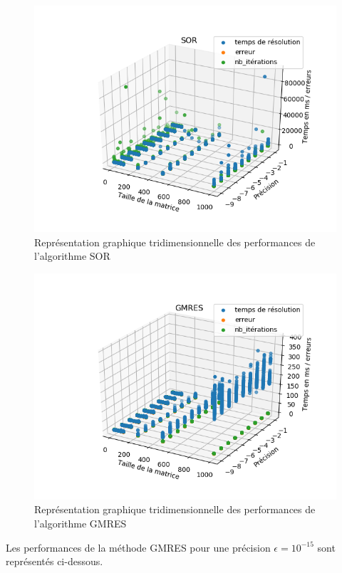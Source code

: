 \begin{figure}[H]
	\includegraphics{../codes/Data/sor3D.png}
	\caption{Représentation graphique tridimensionnelle des performances de l'algorithme SOR}
\end{figure}

\begin{figure}[H]
	\includegraphics{../codes/Data/gmres.png}
	\caption{Représentation graphique tridimensionnelle des performances de l'algorithme GMRES}
\end{figure}

Les performances de la méthode GMRES pour une précision $\epsilon = 10^{-15}$ sont représentés ci-dessous.


